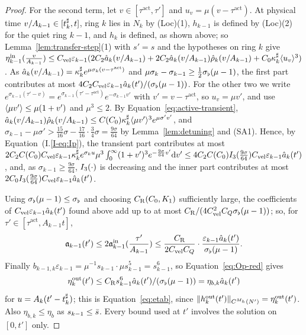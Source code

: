 \begin{proof}
For the second term, let $v\in[\tau^{\mathrm{act}},\tau']$ and
$u_v=\mu(v-\tau^{\mathrm{act}})$. At physical time $v/A_{k-1}\in[t^\sharp_k,t]$, ring $k$ lies in
$N_k$ by (Loc)(1), $h_{k-1}$ is defined by (Loc)(2) for the quiet ring $k-1$, and
$h_k$ is defined, as shown above; so Lemma~\ref{lem:transfer-step}(1) with $s'=s$
and the hypotheses on ring $k$ give
$\eta^{\mathrm{in}}_{k-1}(\frac{v}{A_{k-1}})\le C_{\mathrm{vel}} \varepsilon_{k-1}(2C_2\hat a_k(v/A_{k-1})+2C_2\hat a_k(v/A_{k-1})\hat\rho_k(v/A_{k-1})+C_0\kappa^\sharp_k\langle u_v\rangle^3)$.
As $\hat a_k(v/A_{k-1})=\kappa^\sharp_ke^{\mu\sigma_k(v-\tau^{\mathrm{act}})}$ and
$\mu\sigma_k-\sigma_{k-1}\ge\frac12\sigma_\flat(\mu-1)$, the first part contributes at most
$4C_2C_{\mathrm{vel}} \varepsilon_{k-1}\hat a_k(t')/(\sigma_\flat(\mu-1))$. For the other two we write
$e^{\sigma_{k-1}(\tau'-v)}=e^{\sigma_{k-1}(\tau'-\tau^{\mathrm{act}})}e^{-\sigma_{k-1}v'}$
with $v'=v-\tau^{\mathrm{act}}$, so $u_v=\mu v'$, and use
$\langle \mu v'\rangle\le\mu(1+v')$ and $\mu^3\le2$. By
Equation~\eqref{eq:active-transient},
$\hat a_k(v/A_{k-1})\hat\rho_k(v/A_{k-1})\le C(C_0)\kappa^\sharp_k\langle \mu v'\rangle^3e^{\mu\sigma'v'}$, and
$\sigma_{k-1}-\mu\sigma'>\frac{15}{16}\sigma-\frac{17}{16}\cdot\frac34\sigma=\frac{9\sigma}{64}$
by Lemma~\ref{lem:detuning} and (SA1). Hence, by Equation~(I.\ref{I-eq:Ip}), the
transient part contributes at most
$2C_2C(C_0)C_{\mathrm{vel}} \varepsilon_{k-1}\kappa^\sharp_ke^{\sigma_ku}\mu^3\int_0^\infty(1+v')^3e^{-\frac{9\sigma}{64}v'}\dd v'
\le4C_2C(C_0)I_{3}(\frac{9\sigma}{64})C_{\mathrm{vel}} \varepsilon_{k-1}\hat a_k(t')$,
and, as $\sigma_{k-1}\ge\frac{9\sigma}{64}$, $I_{3}(\cdot)$ is decreasing and the inner part contributes at most
$2C_0I_{3}(\frac{9\sigma}{64})C_{\mathrm{vel}} \varepsilon_{k-1}\hat a_k(t')$.

Using $\sigma_\flat(\mu-1)\le\sigma_\flat$ and choosing $C_{\mathrm R}(C_0,K_1)$ sufficiently large, the coefficients of
$C_{\mathrm{vel}} \varepsilon_{k-1}\hat a_k(t')$ found above add up to at most
$C_{\mathrm R}/(4C_{\mathrm{vel}}^2 C_Q\sigma_\flat(\mu-1))$; so, for $\tau'\in[\tau^{\mathrm{act}},A_{k-1}t]$,
\[
\mathfrak{a}_{k-1}(t')\le2\mathfrak{a}^{\mathrm{in}}_{k-1}(\frac{\tau'}{A_{k-1}})\le\frac{C_{\mathrm R}}{2C_{\mathrm{vel}} C_Q}\cdot\frac{\varepsilon_{k-1}\hat a_k(t')}{\sigma_\flat(\mu-1)} .
\]
Finally $b_{k-1,k}\varepsilon_{k-1}=\mu^{-1}s_{k-1}\cdot\mu s_{k-1}^5=s_{k-1}^6$,
so Equation~\eqref{eq:Op-red} gives
\[
\eta^{\mathrm{out}}_k(t')\le C_{\mathrm R} s_{k-1}^6\hat a_k(t')/(\sigma_\flat(\mu-1))=\eta_{b,k}\hat a_k(t')
\]
for $u=A_k(t'-t^\sharp_k)$; this is Equation~\eqref{eq:etab}, since
$\|h^{\mathrm{out}}_k(t')\|_{C^{M_h}(N')}=\eta^{\mathrm{out}}_k(t')$.
Also $\eta_{b,k}\le\eta_b$ as $s_{k-1}\le\bar s$. Every bound used at $t'$ involves
the solution on $[0,t']$ only.
\end{proof}

